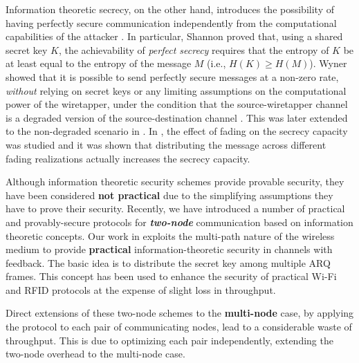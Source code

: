 \documentclass[10pt,letterpaper,conference]{IEEEtran}
\begin{document}
Information theoretic secrecy, on the other hand, introduces the possibility of
having perfectly secure communication independently from the computational
capabilities of the attacker \cite{Shannon49,Wyner75,Maurer93,Gopala06,Tang07,Omar09, Sabagh10, Sabagh11,forensic11,Elmorsy,Arora2009,karim_j,aly_j,multinode_demo}. In particular, Shannon \cite{Shannon49} proved
that, using a shared secret key $K$,  the achievability of \emph{perfect
secrecy} requires that the entropy of $K$ be at least equal to the entropy of
the message $M$ (i.e., $H(K) \geq H(M)$). Wyner showed that it is possible to
send perfectly secure messages at a non-zero rate, \textit{without} relying on
secret keys or any limiting assumptions on the computational power of the
wiretapper, under the condition that the source-wiretapper channel is a degraded
version of the source-destination channel \cite{Wyner75}. This was later
extended to the non-degraded scenario in \cite{Maurer93}. In
\cite{Gopala06,Tang07}, the effect of fading on the secrecy capacity was studied
and it was shown that distributing the message across different fading
realizations actually increases the secrecy capacity.

Although information theoretic security schemes provide provable security, they
have been considered \textbf{not practical} due to the simplifying assumptions
they have to prove their security. Recently, we have introduced a number
of practical and provably-secure protocols for \textbf{\emph{two-node}}
communication based on information theoretic concepts. Our work in \cite{Omar09,
Sabagh10, Sabagh11,forensic11} exploits the multi-path nature of the wireless
medium to provide \textbf{practical} information-theoretic security in channels
with feedback. The basic idea is to distribute the secret key among multiple ARQ
frames. This concept has been used to enhance the security of practical Wi-Fi
and RFID protocols at the expense of slight loss in throughput.

Direct extensions of these two-node schemes to the \textbf{multi-node} case, by applying
the protocol to each pair of communicating nodes, lead to a considerable waste
of throughput. This is due to optimizing each pair independently, extending the
two-node overhead to the multi-node case.
\end{document}
